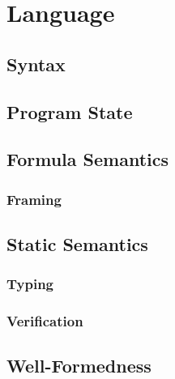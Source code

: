 \section{Language}
\label{sec:language}


    \subsection{Syntax}
    \label{sec:syntax}
    
    
    \subsection{Program State}
    \label{ssec:program-state}
    
        
    \subsection{Formula Semantics}
    \label{ssec:formula-semantics}
    
    
        \subsubsection{Framing}
        \label{sssec:framing}
        
        
    
    \subsection{Static Semantics}
    \label{sec:static-semantics}
    
        
        \subsubsection{Typing}
        \label{sssec:typing}
        
    
        \subsubsection{Verification}
        \label{sssec:verification}
        
    
    \subsection{Well-Formedness}
    \label{sec:well-formedness}
    
    
